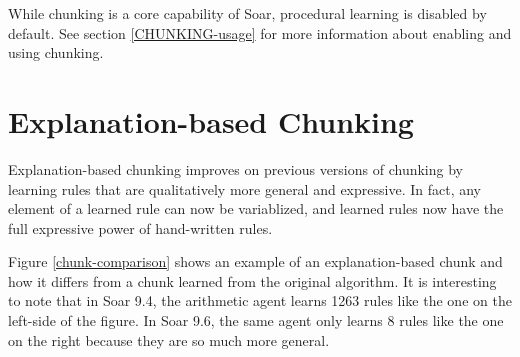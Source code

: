 While chunking is a core capability of Soar, procedural learning is disabled by default.  See section \ref{CHUNKING-usage} for more information about enabling and using chunking.

\section{Explanation-based Chunking}

Explanation-based chunking improves on previous versions of chunking by learning rules that are qualitatively more general and expressive.  In fact, any element of a learned rule can now be variablized, and learned rules now have the full expressive power of hand-written rules.

Figure \ref{chunk-comparison} shows an example of an explanation-based chunk and how it differs from a chunk learned from the original algorithm.  It is interesting to note that in Soar 9.4, the arithmetic agent learns 1263 rules like the one on the left-side of the figure.  In Soar 9.6, the same agent only learns 8 rules like the one on the right because they are so much more general.

